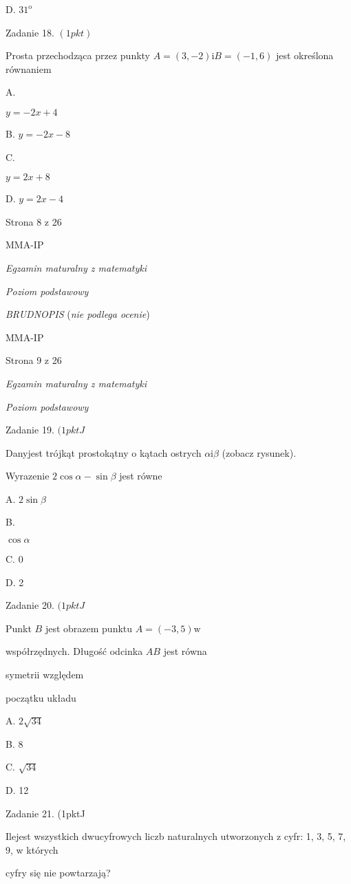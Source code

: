 \documentclass[a4paper,12pt]{article}
\begin{document}
D. $31^{\mathrm{o}}$

Zadanie 18. $(1pkt)$

Prosta przechodząca przez punkty $A=(3,-2)\mathrm{i}B=(-1,6)$ jest określona równaniem

A.

$y=-2x+4$

B. $y=-2x-8$

C.

$y=2x+8$

D. $y=2x-4$

Strona 8 z 26

MMA-IP





{\it Egzamin maturalny z matematyki}

{\it Poziom podstawowy}

{\it BRUDNOPIS} ({\it nie podlega ocenie})

MMA-IP

Strona 9 z 26





{\it Egzamin maturalny z matematyki}

{\it Poziom podstawowy}

Zadanie 19. $(1pktJ$

Danyjest trójkąt prostokątny o kątach ostrych $\alpha \mathrm{i}\beta$ (zobacz rysunek).

Wyrazenie $ 2\cos\alpha-\sin\beta$ jest równe

A. $ 2\sin\beta$

B.

$\cos\alpha$

C. 0

D. 2

Zadanie 20. $(1pktJ$

Punkt $B$ jest obrazem punktu $A=(-3,5) \mathrm{w}$

współrzędnych. Długość odcinka $AB$ jest równa

symetrii względem

początku układu

A. $2\sqrt{34}$

B. 8

C. $\sqrt{34}$

D. 12

Zadanie 21. (1pktJ

Ilejest wszystkich dwucyfrowych liczb naturalnych utworzonych z cyfr: 1, 3, 5, 7, 9, w których

cyfry się nie powtarzają?
\end{document}
